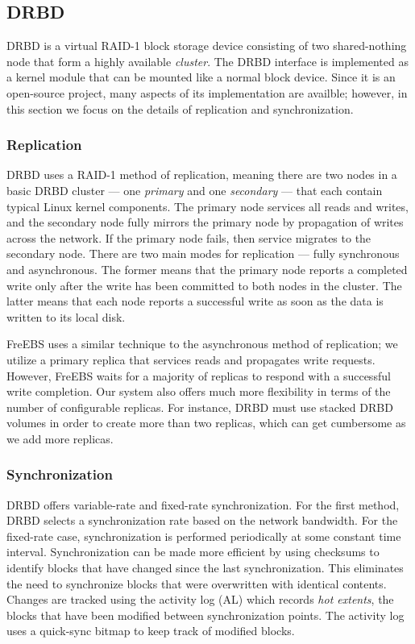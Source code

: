 \subsection{DRBD}
\label{sec:drbd}
DRBD\textsuperscript{\textregistered} is a virtual RAID-1 block storage 
device consisting of two shared-nothing node that form a highly available
\emph{cluster}. The DRBD\textsuperscript{\textregistered} interface is 
implemented as a kernel module that can be mounted like a normal block 
device. Since it is an open-source project, many aspects of its 
implementation are availble; however, in this section we focus on the
details of replication and synchronization.

\subsubsection{Replication}
DRBD\textsuperscript{\textregistered} uses a RAID-1 method of replication, 
meaning there are two nodes in a basic DRBD\textsuperscript{\textregistered} 
cluster --- one \emph{primary} and one \emph{secondary} --- that each
contain typical Linux kernel components\cite{drbd, drbd_manual}. The 
primary node 
services all reads and writes, and the secondary node fully mirrors the 
primary node by propagation of writes across the network. If the primary 
node fails, then service migrates to the secondary node. There are two 
main modes for replication --- fully synchronous and asynchronous. 
The former means that the primary node reports a completed write only after 
the write has been committed to both nodes in the cluster. The latter means 
that each node reports a successful write as soon as the data is written to 
its local disk. 

FreEBS uses a similar technique to the asynchronous method of replication;
we utilize a primary replica that services reads and propagates write 
requests. However, FreEBS waits for a majority of replicas to respond with a
successful write completion. Our system also offers much more flexibility in 
terms of the number of configurable replicas. For instance, 
DRBD\textsuperscript{\textregistered} must use 
stacked DRBD volumes in order to create more than two replicas, which can 
get cumbersome as we add more replicas.

\subsubsection{Synchronization} 
DRBD\textsuperscript{\textregistered} offers 
variable-rate and fixed-rate synchronization\cite{drbd_manual}.
For the first method, DRBD\textsuperscript{\textregistered} selects a 
synchronization rate
based on the network bandwidth. For the fixed-rate case, synchronization is
performed periodically at some constant time interval. Synchronization 
can be made more efficient by using checksums to identify blocks that have 
changed since the last synchronization. This eliminates the need to 
synchronize blocks that were overwritten with identical contents. Changes
are tracked using the activity log (AL) which records \emph{hot extents}, 
the blocks that have been modified between synchronization points. The 
activity log uses a quick-sync bitmap to keep track of modified blocks.

